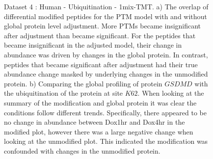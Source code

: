 \documentclass[mcp]{article}
\numberwithin{table}{section}
\begin{document}
\begin{figure}[ht]
\caption{Dataset 4 : Human - Ubiquitination - 1mix-TMT. a) The overlap of differential modified peptides for the PTM model with and without global protein level adjustment. More PTMs became insignificant after adjustment than became significant. For the peptides that became insignificant in the adjusted model, their change in abundance was driven by changes in the global protein. In contrast, peptides that became significant after adjustment had their true abundance change masked by underlying changes in the unmodified protein. b) Comparing the global profiling of protein $GSDMD$ with the ubiquitination of the protein at site $K62$. When looking at the summary of the modification and global protein it was clear the conditions follow different trends. Specifically, there appeared to be no change in abundance between Dox1hr and Dox4hr in the modified plot, however there was a large negative change when looking at the unmodified plot. This indicated the modification was confounded with changes in the unmodified protein.}
\label{fig:data4_plots}
\end{figure}
\end{document}
